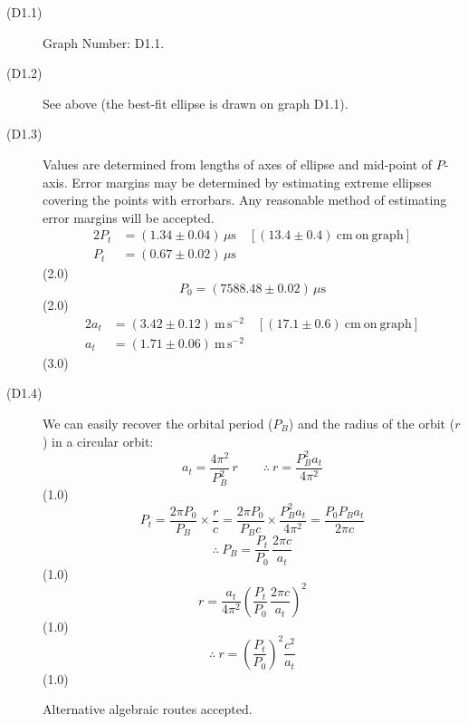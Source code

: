 \begin{description}
\item[(D1.1)] Graph Number: D1.1.

\item[(D1.2)] See above (the best-fit ellipse is drawn on graph D1.1).

\item[(D1.3)] Values are determined from lengths of axes of ellipse and
  mid-point of $P$-axis. Error margins may be determined by estimating
  extreme ellipses covering the points with errorbars. Any reasonable method
  of estimating error margins will be accepted.
  \begin{align*}
    2P_t &= (1.34 \pm 0.04)\,\mu\mathrm{s}
      \quad [(13.4 \pm 0.4)\ \mathrm{cm\ on\ graph}] \\
    P_t &= (0.67 \pm 0.02)\,\mu\mathrm{s}
  \end{align*}
  \hfill(2.0)
  \[ P_0 = (7588.48 \pm 0.02)\,\mu\mathrm{s} \]
  \hfill(2.0)
  \begin{align*}
    2a_t &= (3.42 \pm 0.12)\ \mathrm{m\,s^{-2}}
      \quad [(17.1 \pm 0.6)\ \mathrm{cm\ on\ graph}] \\
    a_t &= (1.71 \pm 0.06)\ \mathrm{m\,s^{-2}}
  \end{align*}
  \hfill(3.0)

\item[(D1.4)] We can easily recover the orbital period ($P_B$) and the radius
  of the orbit ($r$) in a circular orbit:
  \[ a_t = \frac{4\pi^2}{P_B^2}\,r
     \qquad \therefore\ r = \frac{P_B^2 a_t}{4\pi^2} \]
  \hfill(1.0)
  \[ P_t = \frac{2\pi P_0}{P_B} \times \frac{r}{c}
     = \frac{2\pi P_0}{P_B c} \times \frac{P_B^2 a_t}{4\pi^2}
     = \frac{P_0 P_B a_t}{2\pi c} \]
  \[ \therefore\ P_B = \frac{P_t}{P_0}\,\frac{2\pi c}{a_t} \]
  \hfill(1.0)
  \[ r = \frac{a_t}{4\pi^2}
     \left( \frac{P_t}{P_0}\,\frac{2\pi c}{a_t} \right)^2 \]
  \hfill(1.0)
  \[ \therefore\ r = \left( \frac{P_t}{P_0} \right)^2 \frac{c^2}{a_t} \]
  \hfill(1.0)

  Alternative algebraic routes accepted.


\end{description}
